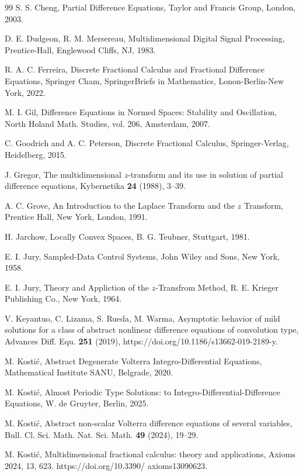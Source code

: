 \documentclass{amsart}
\theoremstyle{definition}
\theoremstyle{remark}
\numberwithin{equation}{section}
\begin{document}
\begin{thebibliography}{99}
S. S. Cheng,
Partial Difference Equations,
Taylor and Francis Group, London, 2003.

D. E. Dudgeon, R. M. Mersereau, 
Multidimensional Digital Signal Processing, 
Prentice-Hall, Englewood Cliffs, NJ, 1983.

R. A. C. Ferreira,
Discrete Fractional Calculus and Fractional Difference Equations,
Springer Cham, SpringerBriefs in Mathematics, Lonon-Berlin-New York, 2022.

M. I. Gil,
Difference Equations in Normed Spaces: Stability and Oscillation,
North Holand Math. Studies, vol. 206, Amsterdam, 2007.

C. Goodrich and A. C. Peterson,
Discrete Fractional Calculus,
Springer-Verlag, Heidelberg, 2015.

J. Gregor,
The multidimensional $z$-transform and its use in solution of partial difference
equations,
Kybernetika {\bf 24} (1988), 3--39.

A. C. Grove,
An Introduction to the Laplace Transform and the $z$ Transform,
Prentice Hall, New York, London, 1991.

H. Jarchow,
Locally Convex Spaces,
B. G. Teubner, Stuttgart, 1981.

E. I. Jury,
Sampled-Data Control Systems,
John Wiley and Sons, New York, 1958.

E. I. Jury, 
Theory and Appliction of the $z$-Transfrom Method,
R. E. Krieger Publishing Co., New York, 1964.

V. Keyantuo, C. Lizama, S. Rueda, M. Warma, 
Asymptotic behavior of mild solutions for a
class of abstract nonlinear difference
equations of convolution type,
Advances Diff. Equ.  {\bf 251} (2019),
https://doi.org/10.1186/s13662-019-2189-y.

M. Kosti\' c,
Abstract Degenerate Volterra Integro-Differential Equations,
Mathematical Institute SANU, Belgrade, 2020.

M. Kosti\'c,
Almost Periodic Type Solutions: to Integro-Differential-Difference Equations,
W. de Gruyter, Berlin, 2025.

M. Kosti\'c,
Abstract non-scalar Volterra difference equations of several variables,
Bull. Cl. Sci. Math. Nat. Sci.
Math. {\bf 49} (2024), 19--29.

M. Kosti\'c,
Multidimensional fractional calculus: theory and applications, 
Axioms 2024, 13,
623. https://doi.org/10.3390/ axioms13090623.


\end{thebibliography}
\end{document}
